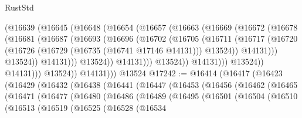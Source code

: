 \begin{lexlean}{RustStd}
\begin{coremodule}
                          (@16639
                            (@16645
                              (@16648
                                (@16654
                                  (@16657
                                    (@16663
                                      (@16669
                                        (@16672
                                          (@16678
                                            (@16681
                                              (@16687
                                                (@16693
                                                  (@16696
                                                    (@16702
                                                      (@16705
                                                        (@16711
                                                          (@16717
                                                            (@16720
                                                              (@16726
                                                                (@16729
                                                                  (@16735 (@16741 @17146 @14131)))
                                                                @13524))
                                                            @14131)))
                                                      @13524))
                                                  @14131)))
                                            @13524))
                                        @14131)))
                                  @13524))
                              @14131)))
                        @13524))
                    @14131)))
              @13524))
          @14131)))
    @13524
@17242 := @16414
    (@16417
      (@16423
        (@16429
          (@16432
            (@16438
              (@16441
                (@16447
                  (@16453
                    (@16456
                      (@16462
                        (@16465
                          (@16471
                            (@16477
                              (@16480
                                (@16486
                                  (@16489
                                    (@16495
                                      (@16501
                                        (@16504
                                          (@16510
                                            (@16513
                                              (@16519
                                                (@16525
                                                  (@16528
                                                    (@16534

\end{coremodule}
\end{lexlean}
